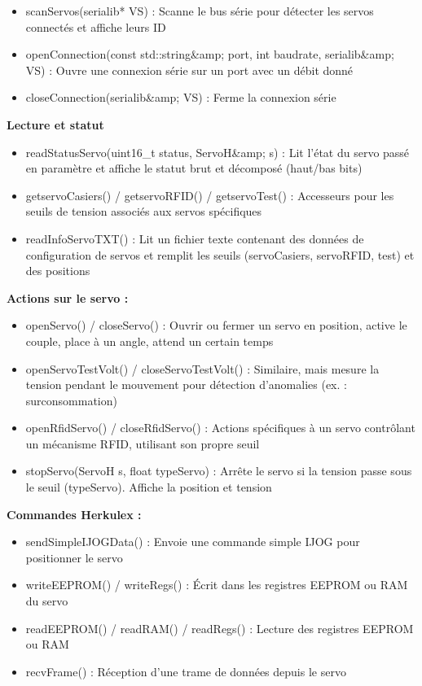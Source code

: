 \documentclass[main.tex]{subfiles}
\begin{document}
\begin{itemize}
\item scanServos(serialib* VS) : Scanne le bus série pour détecter les servos connectés et affiche leurs ID
\item openConnection(const std::string\&amp; port, int baudrate, serialib\&amp; VS) : Ouvre une connexion série sur un port avec un débit donné
\item closeConnection(serialib\&amp; VS) : Ferme la connexion série
\end{itemize}

\textbf{Lecture et statut}

\begin{itemize}
\item readStatusServo(uint16\_t status, ServoH\&amp; s) : Lit l’état du servo passé en paramètre et affiche le statut brut et décomposé (haut/bas bits)
\item getservoCasiers() / getservoRFID() / getservoTest() : Accesseurs pour les seuils de tension associés aux servos spécifiques
\item readInfoServoTXT() : Lit un fichier texte contenant des données de configuration de servos et remplit les seuils (servoCasiers, servoRFID, test) et des positions
\end{itemize}

\textbf{Actions sur le servo :}

\begin{itemize}
\item openServo() / closeServo() : Ouvrir ou fermer un servo en position, active le couple, place à un angle, attend un certain temps
\item openServoTestVolt() / closeServoTestVolt() : Similaire, mais mesure la tension pendant le mouvement pour détection d’anomalies (ex. : surconsommation)
\item openRfidServo() / closeRfidServo() : Actions spécifiques à un servo contrôlant un mécanisme RFID, utilisant son propre seuil
\item stopServo(ServoH s, float typeServo) : Arrête le servo si la tension passe sous le seuil (typeServo). Affiche la position et tension
\end{itemize}

\textbf{Commandes Herkulex :}

\begin{itemize}
\item sendSimpleIJOGData() : Envoie une commande simple IJOG pour positionner le servo
\item writeEEPROM() / writeRegs() : Écrit dans les registres EEPROM ou RAM du servo
\item readEEPROM() / readRAM() / readRegs() : Lecture des registres EEPROM ou RAM
\item recvFrame() : Réception d’une trame de données depuis le servo
\end{itemize}
\end{document}
